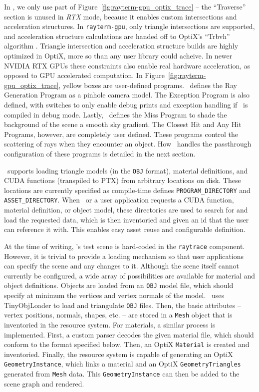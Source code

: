 In \name, we only use part of Figure~\ref{fig:rayterm-gpu_optix_trace} -- the ``Traverse'' section is unused in {\it RTX} mode, because it enables custom intersections and acceleration structures.
In \texttt{rayterm-gpu}, only triangle intersections are supported, and acceleration structure calculations are handed off to OptiX's ``Trbvh'' algorithm \cite{karras2013fast}.
Triangle intersection and acceleration structure builds are highly optimized in OptiX, more so than any user library could acheive.
In newer NVIDIA RTX GPUs these constraints also enable real hardware acceleration, as opposed to GPU accelerated computation.
In Figure~\ref{fig:rayterm-gpu_optix_trace}, yellow boxes are user-defined programs.
\name\ defines the Ray Generation Program as a pinhole camera model.
The Exception Program is also defined, with switches to only enable debug prints and exception handling if \name\ is compiled in debug mode.
Lastly, \name\ defines the Miss Program to shade the background of the scene a smooth sky gradient.
The Closest Hit and Any Hit Programs, however, are completely user defined.
These programs control the scattering of rays when they encounter an object.
How \name\ handles the passthrough configuration of these programs is detailed in the next section.

\name\ supports loading triangle models (in the \texttt{OBJ} format), material definitions, and CUDA functions (transpiled to PTX) from arbitrary locations on disk.
These locations are currently specified as compile-time defines \texttt{PROGRAM\_DIRECTORY} and \texttt{ASSET\_DIRECTORY}.
When \name\ or a user application requests a CUDA function, material definition, or object model, these directories are used to search for and load the requested data, which is then inventoried and given an id that the user can reference it with.
This enables easy asset reuse and configurable definition.


 \label{ch:methods:renderer:parallel:config}

At the time of writing, \name's test scene is hard-coded in the \texttt{raytrace} component.
However, it is trivial to provide a loading mechanism so that user applications can specify the scene and any changes to it.
Although the scene itself cannot currently be configured, a wide array of possibilities are available for material and object definitions.
Objects are loaded from an \texttt{OBJ} model file, which should specify at minimum the vertices and vertex normals of the model.
\name\ uses TinyObjLoader \cite{tinyobjloader} to load and triangulate \texttt{OBJ} files.
Then, the basic attributes -- vertex positions, normals, shapes, etc. -- are stored in a \texttt{Mesh} object that is inventoried in the resource system.
For materials, a similar process is implemented.
First, a custom parser decodes the given material file, which should conform to the format specified below.
Then, an OptiX \texttt{Material} is created and inventoried.
Finally, the resource system is capable of generating an OptiX \texttt{GeometryInstance}, which links a material and an OptiX \texttt{GeometryTriangles} generated from \texttt{Mesh} data.
This \texttt{GeometryInstance} can then be added to the scene graph and rendered.

